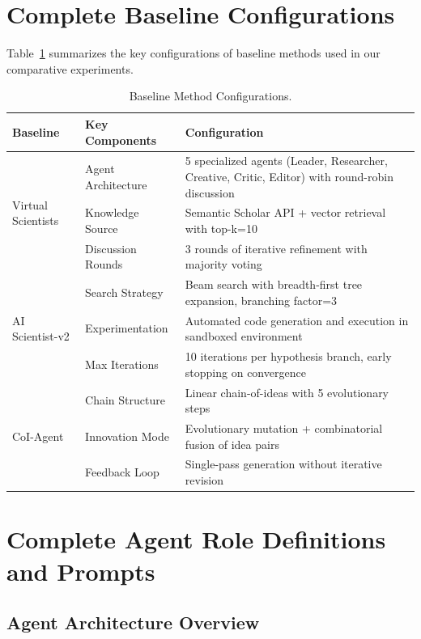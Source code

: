 \section{Complete Baseline Configurations}
\label{app:baseline_config}

Table~\ref{tab:baseline_configs} summarizes the key configurations of baseline methods used in our comparative experiments.

\begin{table}[h]
\centering
\small
\setlength{\tabcolsep}{4pt}
\begin{tabular}{lp{4cm}p{6cm}}
\toprule
\textbf{Baseline} & \textbf{Key Components} & \textbf{Configuration} \\
\midrule
\multirow{3}{*}{Virtual Scientists} 
 & Agent Architecture & 5 specialized agents (Leader, Researcher, Creative, Critic, Editor) with round-robin discussion \\
 & Knowledge Source & Semantic Scholar API + vector retrieval with top-k=10 \\
 & Discussion Rounds & 3 rounds of iterative refinement with majority voting \\
\midrule
\multirow{3}{*}{AI Scientist-v2} 
 & Search Strategy & Beam search with breadth-first tree expansion, branching factor=3 \\
 & Experimentation & Automated code generation and execution in sandboxed environment \\
 & Max Iterations & 10 iterations per hypothesis branch, early stopping on convergence \\
\midrule
\multirow{3}{*}{CoI-Agent} 
 & Chain Structure & Linear chain-of-ideas with 5 evolutionary steps \\
 & Innovation Mode & Evolutionary mutation + combinatorial fusion of idea pairs \\
 & Feedback Loop & Single-pass generation without iterative revision \\
\bottomrule
\end{tabular}
\caption{Baseline Method Configurations.}
\label{tab:baseline_configs}
\end{table}


\section{Complete Agent Role Definitions and Prompts}
\label{app:agent_prompts}

\subsection{Agent Architecture Overview}


